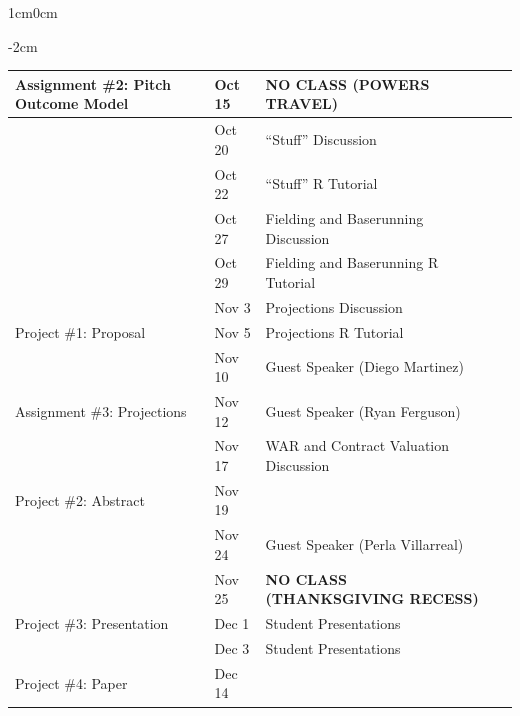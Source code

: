 \documentclass[11pt]{article}
\begin{document}
\begin{adjustwidth}{1cm}{0cm}
\begin{adjustwidth}{-2cm}{}
\begin{tabular}{llll}
      Assignment \#2: Pitch Outcome Model       & Oct 15  & {\bf NO CLASS (POWERS TRAVEL)}\\                                  
      \hline
                                                & Oct 20  & ``Stuff'' Discussion\\
                                                & Oct 22  & ``Stuff'' R Tutorial\\
      \hline
                                                & Oct 27  & Fielding and Baserunning Discussion\\
                                                & Oct 29  & Fielding and Baserunning R Tutorial\\
      \hline
                                                & Nov 3   & Projections Discussion\\
      Project \#1: Proposal                     & Nov 5   & Projections R Tutorial\\
      \hline
                                                & Nov 10  & Guest Speaker (Diego Martinez)\\
      Assignment \#3: Projections               & Nov 12  & Guest Speaker (Ryan Ferguson)\\
      \hline
                                                & Nov 17  & WAR and Contract Valuation Discussion\\
      Project \#2: Abstract                     & Nov 19  & \\
      \hline
                                                & Nov 24  & Guest Speaker (Perla Villarreal)\\
                                                & Nov 25  & {\bf NO CLASS (THANKSGIVING RECESS)}\\
      \hline
      Project \#3: Presentation                 & Dec 1   & Student Presentations\\
                                                & Dec 3   & Student Presentations\\
      \hline \hline
      Project \#4: Paper                        & Dec 14  & \\
    \end{tabular}
  \end{adjustwidth}
\end{adjustwidth}
\end{document}
